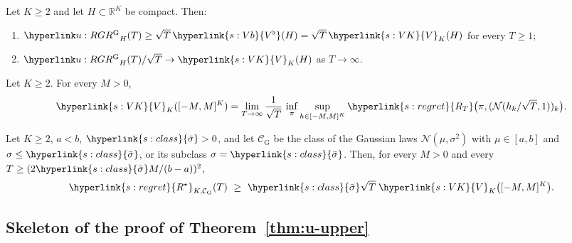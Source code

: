 \documentclass[11pt]{article}
\DeclareRobustCommand{\sy}[2]{{\hyperlink{#1}{#2}}}
\newcommand{\R}{\mathbb{R}}
\newcommand{\1}{\mathbf{1}}
\newcommand{\RT}{\sy{s:regret}{R_T}}
\newcommand{\Rs}{\sy{s:regret}{R^\star}}
\newcommand{\sbar}{\sy{s:class}{\bar\sigma}}
\newcommand{\VK}{\sy{s:VK}{V}}
\newcommand{\Vb}{\sy{s:Vb}{V^\flat}}
\begin{document}
\begin{proposition}\label{prop:u-local}
Let $K\ge2$ and let $H\subset\R^K$ be compact. Then:
\begin{enumerate}
\item[(i)] $\uRG_H(T)\ge\sqrt T\,\Vb(H)=\sqrt T\,\VK_K(H)$ for every $T\ge1$;
\item[(ii)] $\uRG_H(T)/\sqrt T\to\VK_K(H)$ as $T\to\infty$.
\end{enumerate}
\end{proposition}

\begin{corollary}\label{cor:four-c}
Let $K\ge2$. For every $M>0$,
\[
\VK_K([-M,M]^K)=\lim_{T\to\infty}\frac1{\sqrt T}\,\inf_\pi\sup_{h\in[-M,M]^K}\RT\big(\pi,(\mathcal N(h_k/\sqrt T,1))_k\big).
\]
\end{corollary}

\begin{corollary}\label{cor:u-gauss}
Let $K\ge2$, $a<b$, $\sbar>0$, and let $\mathcal C_{\mathrm G}$ be the class of the Gaussian laws $\mathcal N(\mu,\sigma^2)$ with $\mu\in[a,b]$ and
$\sigma\le\sbar$, or its subclass $\sigma=\sbar$. Then, for every $M>0$ and every $T\ge(2\sbar M/(b-a))^2$,
\[
\Rs_{K,\mathcal C_{\mathrm G}}(T)\ \ge\ \sbar\sqrt T\;\VK_K\big([-M,M]^K\big).
\]
\end{corollary}

\subsection{Skeleton of the proof of Theorem~\ref{thm:u-upper}}\label{sec:app-u-skeleton}
\end{document}
